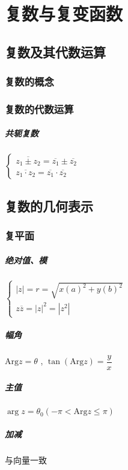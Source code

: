 \documentclass[UTF8,a4paper,12pt,scheme=chinese]{ctexbook}
\newcommand{\Arg}{\mathrm{Arg}}
\theoremstyle{plain}
\begin{document}
	\chapter{复数与复变函数}
	\section{复数及其代数运算}
	\subsection{复数的概念}
	\subsection{复数的代数运算}
	\paragraph{共轭复数}$\left\lbrace
	\begin{array}{l} \overline{z_1\pm z_2}=\overline{z_1}\pm\overline{z_2}\\\overline{z_1\cdot z_2}=\overline{z_1}\cdot\overline{z_2}
	\end{array}
	\right. $
	\section{复数的几何表示}
	\subsection{复平面}
	\paragraph{绝对值、模} $\left\lbrace
	\begin{array}{l} |z|=r=\sqrt{x(a)^2+y(b)^2}\\z\overline{z}=|z|^2=|z^2|
	\end{array}
	\right. $
	\paragraph{幅角}$ \Arg z=\theta $ , $ \tan(\Arg z) = \dfrac{y}{x} $
	\paragraph{主值}$ \arg z=\theta_0(-\pi<\Arg z\leqslant\pi) $
	\paragraph{加减}与向量一致
\end{document}
